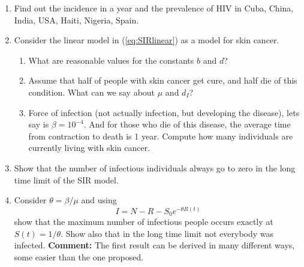 \begin{enumerate}

 \item  Find out the incidence in a year and the prevalence of HIV in Cuba, China, India, USA, Haiti, Nigeria, Spain.

\item Consider the linear model in (\ref{eq:SIRlinear}) as a model for skin cancer.
\begin{enumerate}
 \item What are reasonable values for the constants $b$ and $d$?
 \item Assume that half of people with skin cancer get cure, and half die of this condition. What can we say about $\mu$ and $d_I$?
 \item Force of infection (not actually infection, but developing the disease), lets say is $\beta = 10^{-4}$. And for those who die of this disease, the average time from contraction to death is 1 year. Compute how many individuals are currently living with skin cancer.
 \end{enumerate}

 \item Show that the number of infectious individuals always go to zero in the long time limit of the SIR model.

 \item Consider $\theta  = \beta / \mu$ and using
 \[ I = N -R-S_0 e^{-\theta R(t)}\]
 show that the maximum number of infectious people occurs exactly at $S(t)= 1/\theta$. Show also that in the long time limit not everybody was infected. {\bf Comment:} The first result can be derived in many different ways, some easier than the one proposed.

 \end{enumerate}
